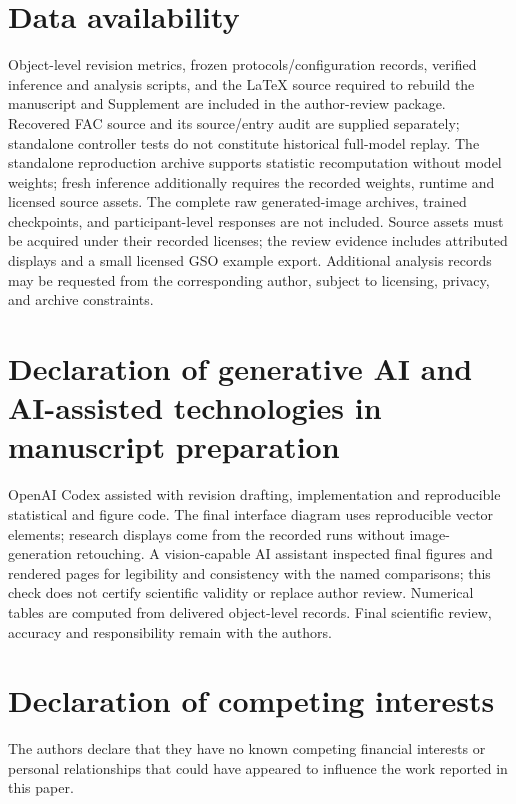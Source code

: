 \documentclass[times,twocolumn,final]{elsarticle}
\begin{document}
\section*{Data availability}

Object-level revision metrics, frozen protocols/configuration records, verified inference and analysis scripts, and the LaTeX source required to rebuild the manuscript and Supplement are included in the author-review package. Recovered FAC source and its source/entry audit are supplied separately; standalone controller tests do not constitute historical full-model replay. The standalone reproduction archive supports statistic recomputation without model weights; fresh inference additionally requires the recorded weights, runtime and licensed source assets. The complete raw generated-image archives, trained checkpoints, and participant-level responses are not included. Source assets must be acquired under their recorded licenses; the review evidence includes attributed displays and a small licensed GSO example export. Additional analysis records may be requested from the corresponding author, subject to licensing, privacy, and archive constraints.

\section*{Declaration of generative AI and AI-assisted technologies in manuscript preparation}
OpenAI Codex assisted with revision drafting, implementation and reproducible statistical and figure code. The final interface diagram uses reproducible vector elements; research displays come from the recorded runs without image-generation retouching. A vision-capable AI assistant inspected final figures and rendered pages for legibility and consistency with the named comparisons; this check does not certify scientific validity or replace author review. Numerical tables are computed from delivered object-level records. Final scientific review, accuracy and responsibility remain with the authors.

\section*{Declaration of competing interests}

The authors declare that they have no known competing financial interests or personal relationships that could have appeared to influence the work reported in this paper.
\end{document}
